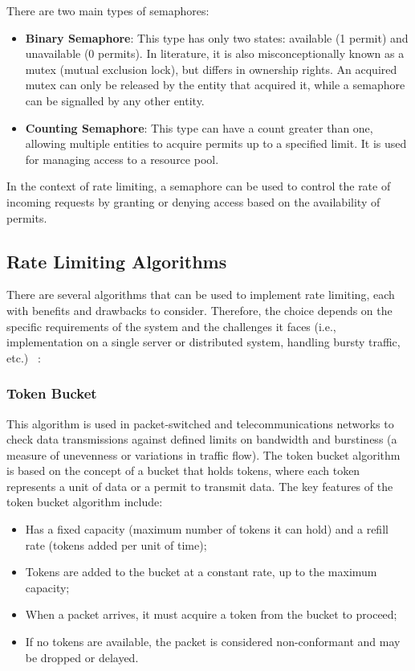 There are two main types of semaphores:
\begin{itemize}
    \item \textbf{Binary Semaphore}:
    This type has only two states: available (1 permit) and unavailable (0 permits).
    In literature, it is also misconceptionally known as a mutex (mutual exclusion lock),
    but differs in ownership rights.
    An acquired mutex can only be released by the entity that acquired it, while a semaphore can be signalled by any other entity.
    \item \textbf{Counting Semaphore}: This type can have a count greater than one, allowing multiple entities to acquire permits up to a specified limit.
    It is used for managing access to a resource pool.
\end{itemize}

In the context of rate limiting, a semaphore can be used to control the rate of incoming requests by granting or denying access based on the availability of permits.

\subsection{Rate Limiting Algorithms}\label{subsec:rate-limiter-algorithms}

There are several algorithms that can be used to implement rate limiting, each with benefits and drawbacks to consider.
Therefore, the choice depends on the specific requirements of the system and the challenges it faces
(i.e., implementation on a single server or distributed system, handling bursty traffic, etc.)
~\cite{medium-rate-limiting-algorithms,nordic-apis-rate-limiting-algorithms}:

\subsubsection{Token Bucket}\label{subsubsec:token-bucket-algorithm}

This algorithm is used in packet-switched and telecommunications networks
to check data transmissions against defined limits on bandwidth and burstiness
(a measure of unevenness or variations in traffic flow).
The token bucket algorithm is based on the concept of a bucket that holds tokens,
where each token represents a unit of data or a permit to transmit data.
The key features of the token bucket algorithm include:

\begin{itemize}
    \item Has a fixed capacity (maximum number of tokens it can hold) and a refill rate (tokens added per unit of time);
    \item Tokens are added to the bucket at a constant rate, up to the maximum capacity;
    \item When a packet arrives, it must acquire a token from the bucket to proceed;
    \item If no tokens are available, the packet is considered non-conformant and may be dropped or delayed.
\end{itemize}

